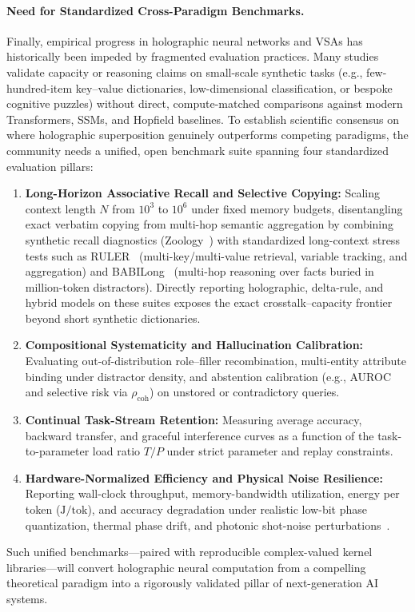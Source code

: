 \paragraph{Need for Standardized Cross-Paradigm Benchmarks.}
Finally, empirical progress in holographic neural networks and VSAs has historically been impeded by fragmented evaluation practices.
Many studies validate capacity or reasoning claims on small-scale synthetic tasks (e.g., few-hundred-item key--value dictionaries, low-dimensional classification, or bespoke cognitive puzzles) without direct, compute-matched comparisons against modern Transformers, SSMs, and Hopfield baselines.
To establish scientific consensus on where holographic superposition genuinely outperforms competing paradigms, the community needs a unified, open benchmark suite spanning four standardized evaluation pillars:
\begin{enumerate}
    \item \textbf{Long-Horizon Associative Recall and Selective Copying:} Scaling context length $N$ from $10^3$ to $10^6$ under fixed memory budgets, disentangling exact verbatim copying from multi-hop semantic aggregation by combining synthetic recall diagnostics (Zoology~\cite{ARORA_2023_ZOOLOGY,JELASSI_2024_REPEAT_AFTER_ME}) with standardized long-context stress tests such as RULER~\cite{HSIEH_2024_RULER} (multi-key/multi-value retrieval, variable tracking, and aggregation) and BABILong~\cite{KURATOV_2024_BABILONG} (multi-hop reasoning over facts buried in million-token distractors). Directly reporting holographic, delta-rule, and hybrid models on these suites exposes the exact crosstalk--capacity frontier beyond short synthetic dictionaries.
    \item \textbf{Compositional Systematicity and Hallucination Calibration:} Evaluating out-of-distribution role--filler recombination, multi-entity attribute binding under distractor density, and abstention calibration (e.g., AUROC and selective risk via $\rho_{\mathrm{coh}}$) on unstored or contradictory queries.
    \item \textbf{Continual Task-Stream Retention:} Measuring average accuracy, backward transfer, and graceful interference curves as a function of the task-to-parameter load ratio $T/P$ under strict parameter and replay constraints.
    \item \textbf{Hardware-Normalized Efficiency and Physical Noise Resilience:} Reporting wall-clock throughput, memory-bandwidth utilization, energy per token ($\mathrm{J/tok}$), and accuracy degradation under realistic low-bit phase quantization, thermal phase drift, and photonic shot-noise perturbations~\cite{WETZSTEIN_2020_OPTICAL_AI,MCMAHON_2023_PHYSICS_OPTICAL_NN}.
\end{enumerate}
Such unified benchmarks---paired with reproducible complex-valued kernel libraries---will convert holographic neural computation from a compelling theoretical paradigm into a rigorously validated pillar of next-generation AI systems.
